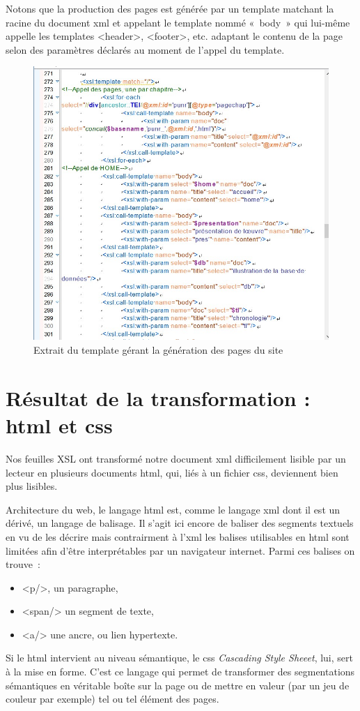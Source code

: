 Notons que la production des pages est générée par un template matchant la racine du document xml et appelant le template nommé «~body~» qui lui-même appelle les templates \go<header>\gf, \go<footer>\gf, etc. adaptant le contenu de la page selon des paramètres déclarés au moment de l'appel du template.
\begin{figure}[H]
    \centering
    \includegraphics[scale=0.5]{img/screen_body.jpg}
    \caption{Extrait du template gérant la génération des pages du site}
    \label{fig:enter-label}
\end{figure}

\section{Résultat de la transformation : html et css}

\label{htmlCss}

Nos feuilles XSL ont transformé notre document xml difficilement lisible par un lecteur en plusieurs documents html, qui, liés à un fichier css, deviennent bien plus lisibles.

Architecture du web, le langage html est, comme le langage xml dont il est un dérivé, un langage de balisage. Il s'agit ici encore de baliser des segments textuels en vu de les décrire mais contrairment à l'xml les balises utilisables en html sont limitées afin d'être interprétables par un navigateur internet. Parmi ces balises on trouve~:
\begin{itemize}
    \item <p/>, un paragraphe,
    \item <span/> un segment de texte,
    \item <a/> une ancre, ou lien hypertexte.
\end{itemize}
Si le html intervient au niveau sémantique, le css \textit{Cascading Style Sheeet}, lui, sert à la mise en forme. C'est ce langage qui permet de transformer des segmentations sémantiques en véritable boîte sur la page ou de mettre en valeur (par un jeu de couleur par exemple) tel ou tel élément des pages.

